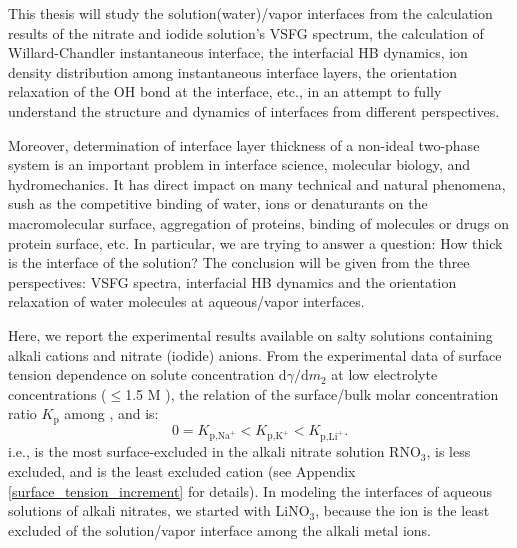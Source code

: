 This thesis will study the solution(water)/vapor interfaces from the calculation results of the nitrate and iodide solution's VSFG spectrum,
the calculation of Willard-Chandler instantaneous interface, 
the interfacial HB dynamics, ion density distribution among instantaneous interface layers, the orientation relaxation of the OH bond at the interface, etc., 
in an attempt to fully understand the structure and dynamics of interfaces from different perspectives. 

Moreover, determination of interface layer thickness of a non-ideal two-phase system is an important problem in interface science, molecular biology, 
and hydromechanics.\cite{LiZhihong2001,Goharzadeh2005,Bano2006} It has direct impact on many technical and natural phenomena, 
sush as the competitive binding of water, ions or denaturants on the macromolecular surface\cite{Arakawa1985,Timasheff2002}, 
aggregation of proteins\cite{Webb2001}, binding of molecules or drugs on protein surface\cite{Hritz2004}, etc. 
In particular, we are trying to answer a question: How thick is the interface of the solution? 
The conclusion will be given from the three perspectives: VSFG spectra, interfacial HB dynamics 
and the orientation relaxation of water molecules at aqueous/vapor interfaces.


Here, we report the experimental results available on salty solutions containing alkali cations and nitrate (iodide) anions\cite{PS03,AJ12,HuaWei2014}. 
From the experimental data of surface tension dependence on solute concentration $\text{d}\gamma/\text{d}m_2$ 
at low electrolyte concentrations ($\leq$1.5 M )\cite{Weissenborn95,Hey81,Jarvis68,Jarvis72}, 
the relation of the surface/bulk molar concentration ratio $K_{\text{p}}$\cite{Pegram2006} among \li, \Na and \K is: 
\begin{equation}
0=K_{\text{p,Na}^+}< K_{\text{p,K}^+}< K_{\text{p,Li}^+}.
\label{eq:bscr}
\end{equation}
i.e., \Na is the most surface-excluded in the alkali nitrate solution RNO$_3$, \K is less excluded, 
and \Li is the least excluded cation (see Appendix \ref{surface_tension_increment} for details).
In modeling the interfaces of aqueous solutions of alkali nitrates, we started with LiNO$_3$, 
because the \Li ion is the least excluded of the solution/vapor interface among the alkali metal ions. 

